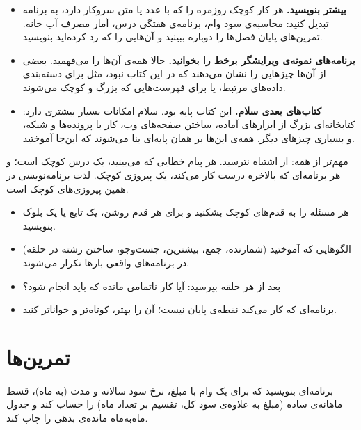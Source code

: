\begin{itemize}
  \item \textbf{بیشتر بنویسید.} هر کار کوچک روزمره را که با عدد یا متن
        سروکار دارد، به برنامه تبدیل کنید: محاسبه‌ی سود وام، برنامه‌ی
        هفتگی درس، آمار مصرف آب خانه. تمرین‌های پایان فصل‌ها را دوباره
        ببینید و آن‌هایی را که رد کرده‌اید بنویسید.
  \item \textbf{برنامه‌های نمونه‌ی ویرایشگر برخط را بخوانید.} حالا همه‌ی
        آن‌ها را می‌فهمید. بعضی از آن‌ها چیزهایی را نشان می‌دهند که در این
        کتاب نبود، مثل  برای دسته‌بندی داده‌های مرتبط، یا
         برای فهرست‌هایی که بزرگ و کوچک می‌شوند.
  \item \textbf{کتاب‌های بعدی سلام.} این کتاب پایه بود. سلام امکانات
        بسیار بیشتری دارد: کتابخانه‌ای بزرگ از ابزارهای آماده، ساختن
        صفحه‌های وب، کار با پرونده‌ها و شبکه، و بسیاری چیزهای دیگر. همه‌ی
        این‌ها بر همان پایه‌ای بنا می‌شوند که این‌جا آموختید.
\end{itemize}

مهم‌تر از همه: از اشتباه نترسید. هر پیام خطایی که می‌بینید، یک درس کوچک
است؛ و هر برنامه‌ای که بالاخره درست کار می‌کند، یک پیروزی کوچک. لذت
برنامه‌نویسی در همین پیروزی‌های کوچک است.

\begin{summary}
\begin{itemize}
  \item هر مسئله را به قدم‌های کوچک بشکنید و برای هر قدم روشن، یک تابع
        یا یک بلوک بنویسید.
  \item الگوهایی که آموختید (شمارنده، جمع، بیشترین، جست‌وجو، ساختن رشته
        در حلقه) در برنامه‌های واقعی بارها تکرار می‌شوند.
  \item بعد از هر حلقه بپرسید: آیا کار ناتمامی مانده که باید انجام شود؟
  \item برنامه‌ای که کار می‌کند نقطه‌ی پایان نیست؛ آن را بهتر، کوتاه‌تر و
        خواناتر کنید.
\end{itemize}
\end{summary}

\section*{تمرین‌ها}

\exercise برنامه‌ای بنویسید که برای یک وام با مبلغ، نرخ سود سالانه و مدت
(به ماه)، قسط ماهانه‌ی ساده (مبلغ به علاوه‌ی سود کل، تقسیم بر تعداد ماه)
را حساب کند و جدول ماه‌به‌ماه مانده‌ی بدهی را چاپ کند.

